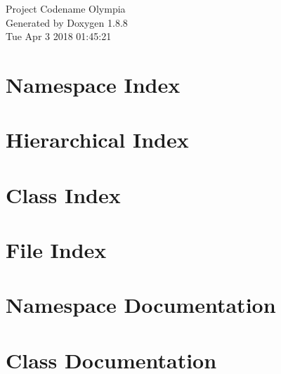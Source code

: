 \documentclass[twoside]{book}
\newcommand{\+}{\discretionary{\mbox{\scriptsize$\hookleftarrow$}}{}{}}
\newcommand{\clearemptydoublepage}{%
  \newpage{\pagestyle{empty}\cleardoublepage}%
}
\begin{document}
\hypersetup{pageanchor=false,
             bookmarks=true,
             bookmarksnumbered=true,
             pdfencoding=unicode
            }
\begin{titlepage}
\vspace*{7cm}
\begin{center}%
{\Large Project Codename Olympia }\\
\vspace*{1cm}
{\large Generated by Doxygen 1.8.8}\\
\vspace*{0.5cm}
{\small Tue Apr 3 2018 01:45:21}\\
\end{center}
\end{titlepage}
\clearemptydoublepage
\tableofcontents
\clearemptydoublepage
{}
\hypersetup{pageanchor=true}

\chapter{Namespace Index}

\chapter{Hierarchical Index}

\chapter{Class Index}

\chapter{File Index}

\chapter{Namespace Documentation}

\chapter{Class Documentation}





















\end{document}
